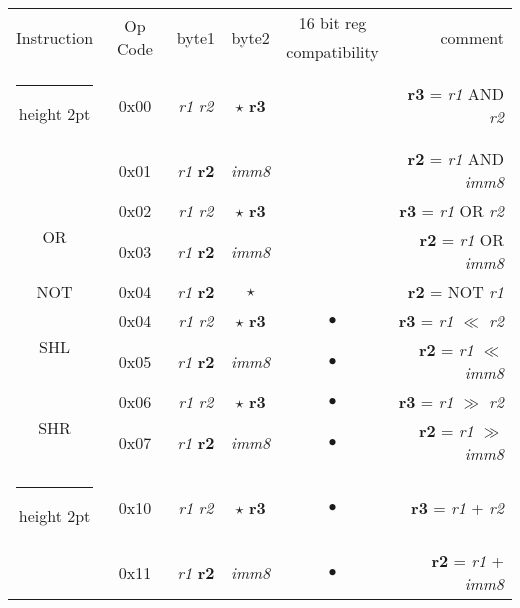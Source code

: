 \documentclass[a4paper,12pt]{article}
\makeatletter
\newcommand{\thickhline}{%
    \noalign {\ifnum 0=`}\fi \hrule height 2pt
    \futurelet \reserved@a \@xhline
}
\makeatother
\begin{document}
\begin{table}[H]
    \centering
    \begin{tabular}{|c|c|c|c|c|r|}
        \hline
        \multirow{2}{*}{Instruction} & \multirow{2}{*}{Op Code}  & \multirow{2}{*}{byte1} & \multirow{2}{*}{byte2} & 16 bit reg & \multirow{2}{*}{comment}\\
         & & & & compatibility & \\
        \thickhline
        \multirow{2}{*}{AND} & 0x00 & \textit{r1} \quad \textit{r2}  & $\star$ \quad \textbf{r3} & & \textbf{r3} = \textit{r1} AND \textit{r2}\\
        \cline{2-6}
                             & 0x01 & \textit{r1} \quad \textbf{r2}  & \textit{imm8} & & \textbf{r2} = \textit{r1} AND \textit{imm8}\\
        \hline
        \multirow{2}{*}{OR} & 0x02 & \textit{r1} \quad \textit{r2}  & $\star$ \quad \textbf{r3} & & \textbf{r3} = \textit{r1} OR \textit{r2}\\
        \cline{2-6}
                            & 0x03 & \textit{r1} \quad \textbf{r2}  & \textit{imm8} & & \textbf{r2} = \textit{r1} OR \textit{imm8}\\
        \hline
        NOT & 0x04 & \textit{r1} \quad \textbf{r2} & $\star$ & & \textbf{r2} = NOT \textit{r1} \\
        \hline
        \multirow{2}{*}{SHL} & 0x04 & \textit{r1} \quad \textit{r2} & $\star$ \quad \textbf{r3} & $\bullet$ & \textbf{r3} = \textit{r1} $\ll$ \textit{r2} \\
        \cline{2-6}
                            & 0x05 & \textit{r1} \quad \textbf{r2} & \textit{imm8} & $\bullet$ & \textbf{r2} = \textit{r1} $\ll$ \textit{imm8} \\
        \hline
        \multirow{2}{*}{SHR} & 0x06 & \textit{r1} \quad \textit{r2} & $\star$ \quad \textbf{r3} & $\bullet$ & \textbf{r3} = \textit{r1} $\gg$ \textit{r2} \\
        \cline{2-6}
                            & 0x07 & \textit{r1} \quad \textbf{r2} & \textit{imm8} & $\bullet$ & \textbf{r2} = \textit{r1} $\gg$ \textit{imm8} \\
        \thickhline
        \multirow{2}{*}{ADD} & 0x10 & \textit{r1} \quad \textit{r2}  & $\star$ \quad \textbf{r3} & $\bullet$ & \textbf{r3} = \textit{r1} + \textit{r2}\\
        \cline{2-6}
                             & 0x11 & \textit{r1} \quad \textbf{r2}  & \textit{imm8} & $\bullet$ & \textbf{r2} = \textit{r1} + \textit{imm8}\\

\end{tabular}
\end{table}
\end{document}
